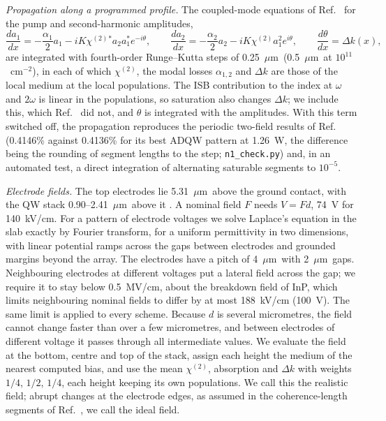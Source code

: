 \documentclass[11pt]{article}
\newcommand{\chitwo}{\chi^{(2)}}
\newcommand{\um}{~$\mu$m}
\begin{document}
\emph{Propagation along a programmed profile.} The coupled-mode equations of Ref.~\cite{OwnbyN1} for the pump and second-harmonic amplitudes,
\begin{equation}
\frac{da_1}{dx}=-\frac{\alpha_1}{2}a_1-iK\chitwo{}^*a_2a_1^*e^{-i\theta},\qquad
\frac{da_2}{dx}=-\frac{\alpha_2}{2}a_2-iK\chitwo a_1^2e^{i\theta},\qquad \frac{d\theta}{dx}=\Delta k(x),
\end{equation}
are integrated with fourth-order Runge--Kutta steps of 0.25\um\ (0.5\um\ at $10^{11}$~cm$^{-2}$), in each of which $\chitwo$, the modal losses $\alpha_{1,2}$ and $\Delta k$ are those of the local medium at the local populations. The ISB contribution to the index at $\omega$ and $2\omega$ is linear in the populations, so saturation also changes $\Delta k$; we include this, which Ref.~\cite{OwnbyN1} did not, and $\theta$ is integrated with the amplitudes. With this term switched off, the propagation reproduces the periodic two-field results of Ref.~\cite{OwnbyN1} (0.4146\% against 0.4136\% for its best ADQW pattern at 1.26~W, the difference being the rounding of segment lengths to the step; \texttt{n1\_check.py}) and, in an automated test, a direct integration of alternating saturable segments to $10^{-5}$.

\emph{Electrode fields.} The top electrodes lie 5.31\um\ above the ground contact, with the QW stack 0.90--2.41\um\ above it \cite{OwnbyN1}. A nominal field $F$ needs $V=Fd$, 74~V for 140~kV/cm. For a pattern of electrode voltages we solve Laplace's equation in the slab exactly by Fourier transform, for a uniform permittivity in two dimensions, with linear potential ramps across the gaps between electrodes and grounded margins beyond the array. The electrodes have a pitch of 4\um\ with 2\um\ gaps. Neighbouring electrodes at different voltages put a lateral field across the gap; we require it to stay below 0.5~MV/cm, about the breakdown field of InP, which limits neighbouring nominal fields to differ by at most 188~kV/cm (100~V). The same limit is applied to every scheme. Because $d$ is several micrometres, the field cannot change faster than over a few micrometres, and between electrodes of different voltage it passes through all intermediate values. We evaluate the field at the bottom, centre and top of the stack, assign each height the medium of the nearest computed bias, and use the mean $\chitwo$, absorption and $\Delta k$ with weights $1/4$, $1/2$, $1/4$, each height keeping its own populations. We call this the realistic field; abrupt changes at the electrode edges, as assumed in the coherence-length segments of Ref.~\cite{OwnbyN1}, we call the ideal field.
\end{document}
